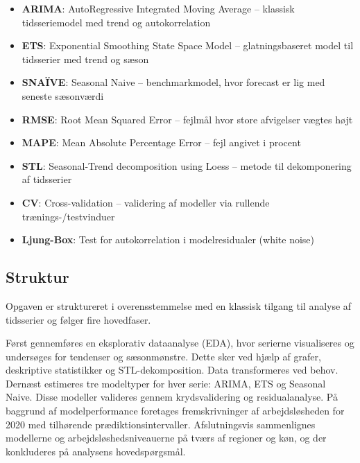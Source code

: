 \documentclass[
]{article}
\providecommand{\tightlist}{%
  \setlength{\itemsep}{0pt}\setlength{\parskip}{0pt}}\usepackage{longtable,booktabs,array}
\begin{document}
\begin{itemize}
\tightlist
\item
  \textbf{ARIMA}: AutoRegressive Integrated Moving Average -- klassisk
  tidsseriemodel med trend og autokorrelation\\
\item
  \textbf{ETS}: Exponential Smoothing State Space Model --
  glatningsbaseret model til tidsserier med trend og sæson\\
\item
  \textbf{SNAÏVE}: Seasonal Naive -- benchmarkmodel, hvor forecast er
  lig med seneste sæsonværdi\\
\item
  \textbf{RMSE}: Root Mean Squared Error -- fejlmål hvor store
  afvigelser vægtes højt\\
\item
  \textbf{MAPE}: Mean Absolute Percentage Error -- fejl angivet i
  procent\\
\item
  \textbf{STL}: Seasonal-Trend decomposition using Loess -- metode til
  dekomponering af tidsserier\\
\item
  \textbf{CV}: Cross-validation -- validering af modeller via rullende
  trænings-/testvinduer\\
\item
  \textbf{Ljung-Box}: Test for autokorrelation i modelresidualer (white
  noise)
\end{itemize}

\subsection{Struktur}\label{struktur}

Opgaven er struktureret i overensstemmelse med en klassisk tilgang til
analyse af tidsserier og følger fire hovedfaser.

Først gennemføres en eksplorativ dataanalyse (EDA), hvor serierne
visualiseres og undersøges for tendenser og sæsonmønstre. Dette sker ved
hjælp af grafer, deskriptive statistikker og STL-dekomposition. Data
transformeres ved behov. Dernæst estimeres tre modeltyper for hver
serie: ARIMA, ETS og Seasonal Naive. Disse modeller valideres gennem
krydsvalidering og residualanalyse. På baggrund af modelperformance
foretages fremskrivninger af arbejdsløsheden for 2020 med tilhørende
prædiktionsintervaller. Afslutningsvis sammenlignes modellerne og
arbejdsløshedsniveauerne på tværs af regioner og køn, og der konkluderes
på analysens hovedspørgsmål.
\end{document}
